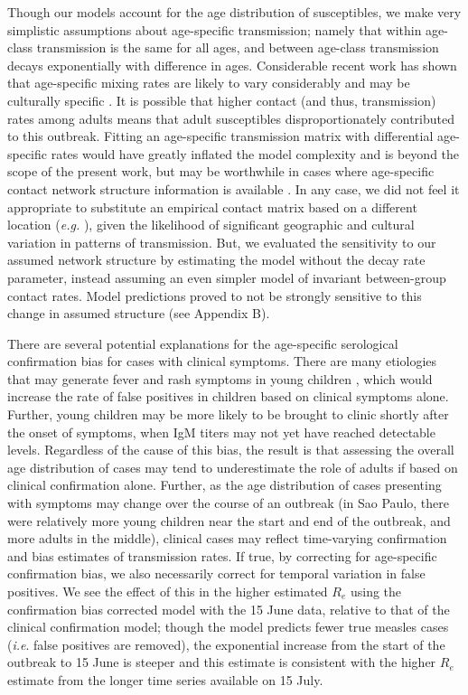 Though our models account for the age distribution of susceptibles, we make very simplistic assumptions about age-specific transmission; namely that within age-class transmission is the same for all ages, and between age-class transmission decays exponentially with difference in ages. Considerable recent work has shown that age-specific mixing rates are likely to vary considerably and may be culturally specific \cite{Mossong_2008}. It is possible that higher contact (and thus, transmission) rates among adults means that adult susceptibles disproportionately contributed to this outbreak. Fitting an age-specific transmission matrix with differential age-specific rates would have greatly inflated the model complexity and is beyond the scope of the present work, but may be worthwhile in cases where age-specific contact network structure information is available \cite{327793}. In any case, we did not feel it appropriate to substitute an empirical contact matrix based on a different location (\emph{e.g.} \cite{Mossong_2008}), given the likelihood of significant geographic and cultural variation in patterns of transmission. But, we evaluated the sensitivity to our assumed network structure by estimating the model without the decay rate parameter, instead assuming an even simpler model of invariant between-group contact rates. Model predictions proved to not be strongly sensitive to this change in assumed structure (see Appendix B).

There are several potential explanations for the age-specific serological confirmation bias for cases with clinical symptoms. There are many etiologies that may generate fever and rash symptoms in young children \cite{Hutchins_2004,Ho_2014,GUY_2004,31c964}, which would increase the rate of false positives in children based on clinical symptoms alone. Further, young children may be more likely to be brought to clinic shortly after the onset of symptoms, when IgM titers may not yet have reached detectable levels. Regardless of the cause of this bias, the result is that assessing the overall age distribution of cases may tend to underestimate the role of adults if based on clinical confirmation alone. Further, as the age distribution of cases presenting with symptoms may change over the course of an outbreak (in Sao Paulo, there were relatively more young children near the start and end of the outbreak, and more adults in the middle), clinical cases may reflect time-varying confirmation and bias estimates of transmission rates. If true, by correcting for age-specific confirmation bias, we also necessarily correct for temporal variation in false positives. We see the effect of this in the higher estimated $R_e$ using the confirmation bias corrected model with the 15 June data, relative to that of the clinical confirmation model; though the model predicts fewer true measles cases (\emph{i.e}. false positives are removed), the exponential increase from the start of the outbreak to 15 June is steeper and this estimate is consistent with the higher $R_e$ estimate from the longer time series available on 15 July.

